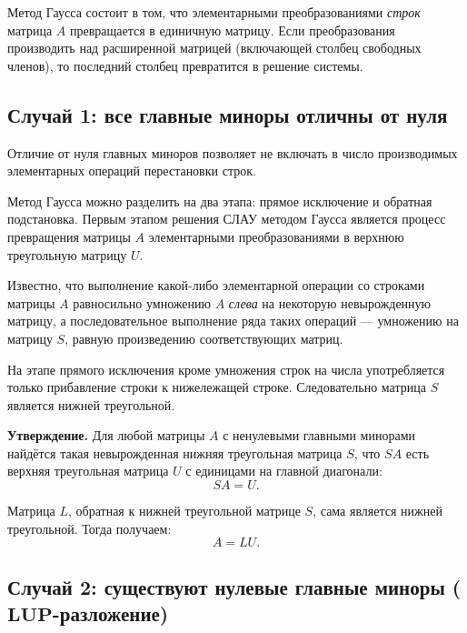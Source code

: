 \documentclass[11pt,a4paper]{article}
\begin{document}
Метод Гаусса состоит в том, что элементарными преобразованиями
\emph{строк} матрица \(A\) превращается в единичную матрицу. Если
преобразования производить над расширенной матрицей (включающей столбец
свободных членов), то последний столбец превратится в решение системы.

    \hypertarget{ux441ux43bux443ux447ux430ux439-1-ux432ux441ux435-ux433ux43bux430ux432ux43dux44bux435-ux43cux438ux43dux43eux440ux44b-ux43eux442ux43bux438ux447ux43dux44b-ux43eux442-ux43dux443ux43bux44f}{%
\subsection{Случай 1: все главные миноры отличны от
нуля}\label{ux441ux43bux443ux447ux430ux439-1-ux432ux441ux435-ux433ux43bux430ux432ux43dux44bux435-ux43cux438ux43dux43eux440ux44b-ux43eux442ux43bux438ux447ux43dux44b-ux43eux442-ux43dux443ux43bux44f}}

Отличие от нуля главных миноров позволяет не включать в число
производимых элементарных операций перестановки строк.

Метод Гаусса можно разделить на два этапа: прямое исключение и обратная
подстановка. Первым этапом решения СЛАУ методом Гаусса является процесс
превращения матрицы \(A\) элементарными преобразованиями в верхнюю
треугольную матрицу \(U\).

Известно, что выполнение какой-либо элементарной операции со строками
матрицы \(A\) равносильно умножению \(A\) \emph{слева} на некоторую
невырожденную матрицу, а последовательное выполнение ряда таких операций
--- умножению на матрицу \(S\), равную произведению соответствующих
матриц.

На этапе прямого исключения кроме умножения строк на числа употребляется
только прибавление строки к нижележащей строке. Следовательно матрица
\(S\) является нижней треугольной.

\textbf{Утверждение.} Для любой матрицы \(A\) с ненулевыми главными
минорами найдётся такая невырожденная нижняя треугольная матрица \(S\),
что \(SA\) есть верхняя треугольная матрица \(U\) с единицами на главной
диагонали: \[ SA = U. \]

Матрица \(L\), обратная к нижней треугольной матрице \(S\), сама
является нижней треугольной. Тогда получаем: \[ A = LU. \]

    \hypertarget{ux441ux43bux443ux447ux430ux439-2-ux441ux443ux449ux435ux441ux442ux432ux443ux44eux442-ux43dux435ux43dux443ux43bux435ux432ux44bux435-ux433ux43bux430ux432ux43dux44bux435-ux43cux438ux43dux43eux440ux44b-mathbflup-ux440ux430ux437ux43bux43eux436ux435ux43dux438ux435}{%
\subsection{\texorpdfstring{Случай 2: существуют нулевые главные
миноры
(\(\mathbf{LUP}\)-разложение)}{Случай 2: существуют нулевые главные миноры (LUP-разложение)}}\label{ux441ux43bux443ux447ux430ux439-2-ux441ux443ux449ux435ux441ux442ux432ux443ux44eux442-ux43dux435ux43dux443ux43bux435ux432ux44bux435-ux433ux43bux430ux432ux43dux44bux435-ux43cux438ux43dux43eux440ux44b-mathbflup-ux440ux430ux437ux43bux43eux436ux435ux43dux438ux435}}
\end{document}
